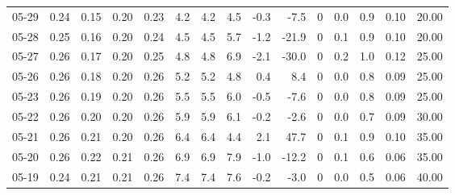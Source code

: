 \begin{threeparttable}
{\begin{tabular}{lrrrrrrrrrrrrrr}
  05-29 &          0.24 &          0.15 &          0.20 &        0.23 &                 4.2 &                4.2 &                 4.5 &       -0.3 &         -7.5 &              0 &                 0.0 &              0.9 &            0.10 &                  20.00 \\
  05-28 &          0.25 &          0.16 &          0.20 &        0.24 &                 4.5 &                4.5 &                 5.7 &       -1.2 &        -21.9 &              0 &                 0.1 &              0.9 &            0.10 &                  20.00 \\
  05-27 &          0.26 &          0.17 &          0.20 &        0.25 &                 4.8 &                4.8 &                 6.9 &       -2.1 &        -30.0 &              0 &                 0.2 &              1.0 &            0.12 &                  25.00 \\
  05-26 &          0.26 &          0.18 &          0.20 &        0.26 &                 5.2 &                5.2 &                 4.8 &        0.4 &          8.4 &              0 &                 0.0 &              0.8 &            0.09 &                  25.00 \\
  05-23 &          0.26 &          0.19 &          0.20 &        0.26 &                 5.5 &                5.5 &                 6.0 &       -0.5 &         -7.6 &              0 &                 0.0 &              0.8 &            0.09 &                  25.00 \\
  05-22 &          0.26 &          0.20 &          0.20 &        0.26 &                 5.9 &                5.9 &                 6.1 &       -0.2 &         -2.6 &              0 &                 0.0 &              0.7 &            0.09 &                  30.00 \\
  05-21 &          0.26 &          0.21 &          0.20 &        0.26 &                 6.4 &                6.4 &                 4.4 &        2.1 &         47.7 &              0 &                 0.1 &              0.9 &            0.10 &                  35.00 \\
  05-20 &          0.26 &          0.22 &          0.21 &        0.26 &                 6.9 &                6.9 &                 7.9 &       -1.0 &        -12.2 &              0 &                 0.1 &              0.6 &            0.06 &                  35.00 \\
  05-19 &          0.24 &          0.21 &          0.21 &        0.26 &                 7.4 &                7.4 &                 7.6 &       -0.2 &         -3.0 &              0 &                 0.0 &              0.5 &            0.06 &                  40.00 \\

\end{tabular}}
\end{threeparttable}
